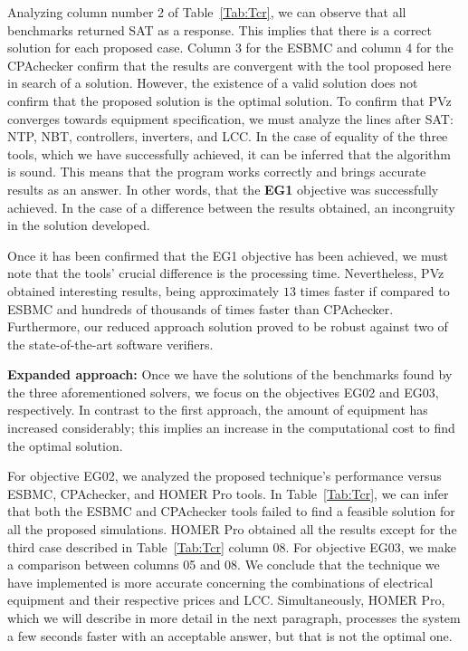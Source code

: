\documentclass[journal]{IEEEtran}
\begin{document}
Analyzing column number 2 of Table~\ref{Tab:Tcr}, we can observe that all benchmarks returned SAT as a response. This implies that there is a correct solution for each proposed case. Column 3 for the ESBMC and column 4 for the CPAchecker confirm that the results are convergent with the tool proposed here in search of a solution. However, the existence of a valid solution does not confirm that the proposed solution is the optimal solution. To confirm that PVz converges towards equipment specification, we must analyze the lines after SAT: NTP, NBT, controllers, inverters, and LCC. In the case of equality of the three tools, which we have successfully achieved, it can be inferred that the algorithm is sound. This means that the program works correctly and brings accurate results as an answer. In other words, that the \textbf{EG1} objective was successfully achieved. In the case of a difference between the results obtained, an incongruity in the solution developed.

Once it has been confirmed that the EG1 objective has been achieved, we must note that the tools' crucial difference is the processing time. Nevertheless, PVz obtained interesting results, being approximately $13$ times faster if compared to ESBMC and hundreds of thousands of times faster than CPAchecker. Furthermore, our reduced approach solution proved to be robust against two of the state-of-the-art software verifiers.

\textbf{Expanded approach:} Once we have the solutions of the benchmarks found by the three aforementioned solvers, we focus on the objectives EG02 and EG03, respectively. In contrast to the first approach, the amount of equipment has increased considerably; this implies an increase in the computational cost to find the optimal solution.

For objective EG02, we analyzed the proposed technique's performance versus ESBMC, CPAchecker, and HOMER Pro tools. In Table~\ref{Tab:Tcr}, we can infer that both the ESBMC and CPAchecker tools failed to find a feasible solution for all the proposed simulations. HOMER Pro obtained all the results except for the third case described in Table~\ref{Tab:Tcr} column 08. For objective EG03, we make a comparison between columns 05 and 08. We conclude that the technique we have implemented is more accurate concerning the combinations of electrical equipment and their respective prices and LCC. Simultaneously, HOMER Pro, which we will describe in more detail in the next paragraph, processes the system a few seconds faster with an acceptable answer, but that is not the optimal one.
\end{document}
